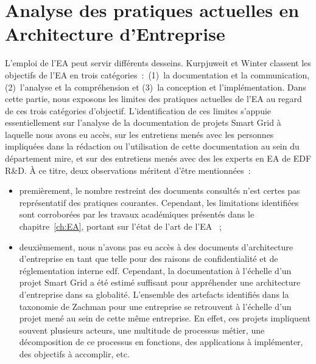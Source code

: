 \section{Analyse des pratiques actuelles en Architecture d'Entreprise}


L'emploi de l'EA peut servir différents desseins. Kurpjuweit et Winter
\cite{kurpjuweit2007viewpoint} classent les objectifs de l'EA en trois
catégories~:~(1)~la documentation et la communication, (2)~l'analyse
et la compréhension et (3)~la conception et l'implémentation. Dans
cette partie, nous exposons les limites des pratiques actuelles de
l'EA au regard de ces trois catégories d'objectif. L'identification de
ces limites s'appuie essentiellement sur l'analyse de la documentation
de projets Smart Grid à laquelle nous avons eu accès, sur les
entretiens menés avec les personnes impliquées dans la rédaction ou
l'utilisation de cette documentation au sein du département
\gls{mire}, et sur des entretiens menés avec des les experts en EA de
EDF R\&D. À ce titre, deux observations méritent d'être mentionnées~:

\begin{itemize}

 \item  premièrement, le nombre restreint des documents consultés
 n'est certes pas représentatif des pratiques courantes. Cependant,
 les limitations identifiées sont corroborées par les travaux
 académiques présentés dans le chapitre~\ref{ch:EA}, portant sur
 l'état de l'art de l'EA ~;

 \item deuxièmement, nous n'avons pas eu accès à des documents
 d'architecture d'entreprise en tant que telle pour des raisons de
 confidentialité et de réglementation interne \gls{edf}. Cependant,
 la documentation à l'échelle d'un projet Smart Grid a été estimé
 suffisant pour appréhender une architecture d'entreprise dans sa
 globalité. L'ensemble des artefacts identifiés dans la taxonomie de
 Zachman pour une entreprise se retrouvent à l'échelle d'un projet
 mené au sein de cette même entreprise. En effet, ces projets
 impliquent souvent plusieurs acteurs, une multitude de processus
 métier, une décomposition de ce processus en fonctions, des
 applications à implémenter, des objectifs à accomplir, etc.

\end{itemize}



